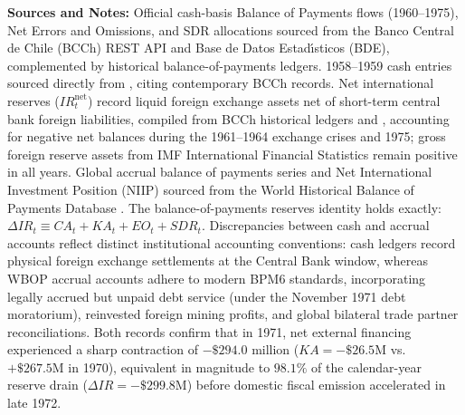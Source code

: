 \begin{landscape}
\begin{table}[!htbp]
{\begin{tabular}{lrrrrrrrrrrrrrrrrrr}
\end{tabular}%
}
\vspace{0.3em}
\begin{minipage}{\linewidth}
\scriptsize
\textbf{Sources and Notes:} Official cash-basis Balance of Payments flows (1960--1975), Net Errors and Omissions, and SDR allocations sourced from the Banco Central de Chile (BCCh) REST API and Base de Datos Estad\'{\i}sticos (BDE), complemented by historical balance-of-payments ledgers. 1958--1959 cash entries sourced directly from \citet[Table~7.4, p.~178]{Stallings1978}, citing contemporary BCCh records. Net international reserves ($IR^{\text{net}}_t$) record liquid foreign exchange assets net of short-term central bank foreign liabilities, compiled from BCCh historical ledgers and \citet{Stallings1978}, accounting for negative net balances during the 1961--1964 exchange crises and 1975; gross foreign reserve assets from IMF International Financial Statistics remain positive in all years. Global accrual balance of payments series and Net International Investment Position (NIIP) sourced from the World Historical Balance of Payments Database \citep{NievasPiketty2025}. The balance-of-payments reserves identity holds exactly: $\Delta IR_t \equiv CA_t + KA_t + EO_t + SDR_t$. Discrepancies between cash and accrual accounts reflect distinct institutional accounting conventions: cash ledgers record physical foreign exchange settlements at the Central Bank window, whereas WBOP accrual accounts adhere to modern BPM6 standards, incorporating legally accrued but unpaid debt service (under the November 1971 debt moratorium), reinvested foreign mining profits, and global bilateral trade partner reconciliations. Both records confirm that in 1971, net external financing experienced a sharp contraction of $-\$294.0$ million ($KA = -\$26.5\text{M}$ vs. $+\$267.5\text{M}$ in 1970), equivalent in magnitude to $98.1\%$ of the calendar-year reserve drain ($\Delta IR = -\$299.8\text{M}$) before domestic fiscal emission accelerated in late 1972.
\end{minipage}
\end{table}
\end{landscape}
